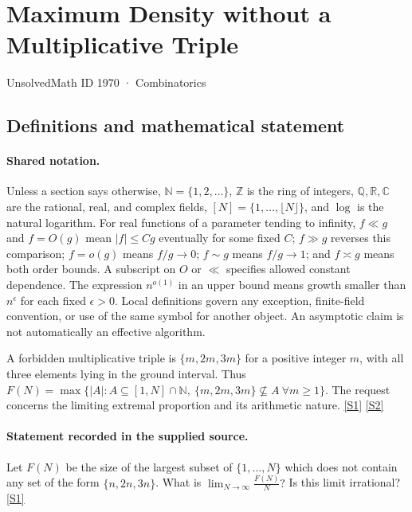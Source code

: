 \documentclass[11pt,a4paper]{article}
\newcommand{\N}{\mathbb{N}}
\newcommand{\Z}{\mathbb{Z}}
\newcommand{\Q}{\mathbb{Q}}
\newcommand{\R}{\mathbb{R}}
\newcommand{\C}{\mathbb{C}}
\newcommand{\sref}[2]{\hyperlink{source:#1:#2}{[S#2]}}
\begin{document}

\setcounter{section}{1969}

\section{Maximum Density without a Multiplicative Triple}\label{1970}

{\small\sffamily UnsolvedMath ID 1970 · Combinatorics}

\subsection{Definitions and mathematical statement}

\paragraph{Shared notation.}Unless a section says otherwise, $\N=\{1,2,\ldots\}$,
$\Z$ is the ring of integers, $\Q,\R,\C$ are the rational, real, and complex
fields, $[N]=\{1,\ldots,\lfloor N\rfloor\}$, and $\log$ is the natural
logarithm. For real functions of a parameter tending to infinity,
$f\ll g$ and $f=O(g)$ mean $|f|\leq Cg$ eventually for some fixed $C$;
$f\gg g$ reverses this comparison; $f=o(g)$ means $f/g\to0$;
$f\sim g$ means $f/g\to1$; and $f\asymp g$ means both order bounds.
A subscript on $O$ or $\ll$ specifies allowed constant dependence.
The expression $n^{o(1)}$ in an upper bound means growth smaller than
$n^\epsilon$ for each fixed $\epsilon>0$. Local definitions govern any
exception, finite-field convention, or use of the same symbol for another
object. An asymptotic claim is not automatically an effective algorithm.



A forbidden multiplicative triple is $\{m,2m,3m\}$ for a positive integer $m$, with all three elements lying in the ground interval. Thus $F(N)=\max\{|A|:A\subseteq[1,N]\cap\N,\ \{m,2m,3m\}\nsubseteq A\ \forall m\geq1\}$. The request concerns the limiting extremal proportion and its arithmetic nature. \sref{1970}{1} \sref{1970}{2}

\paragraph{Statement recorded in the supplied source.}
Let $F(N)$ be the size of the largest subset of $\{1,\ldots,N\}$ which does not contain any set of the form $\{n,2n,3n\}$. What is $  \lim_{N\to \infty}\frac{F(N)}{N}? $ Is this limit irrational? \sref{1970}{1}
\end{document}

